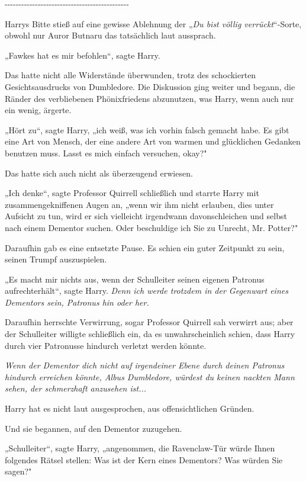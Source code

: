 {-\/-\/-\/-\/-\/-\/-\/-\/-\/-\/-\/-\/-\/-\/-\/-\/-\/-\/-\/-\/-\/-\/-\/-\/-\/-\/-\/-\/-\/-\/-\/-\/-\/-\/-\/-\/-\/-\/-\/-\/-\/-\/-\/-\/-

Harrys Bitte stieß auf eine gewisse Ablehnung der „\emph{Du bist völlig verrückt}“-Sorte, obwohl nur Auror Butnaru das tatsächlich laut aussprach.

„Fawkes hat es mir befohlen“, sagte Harry.

Das hatte nicht alle Widerstände überwunden, trotz des schockierten Gesichtsausdrucks von Dumbledore. Die Diskussion ging weiter und begann, die Ränder des verbliebenen Phönixfriedens abzunutzen, was Harry, wenn auch nur ein wenig, ärgerte.

„Hört zu“, sagte Harry, „ich weiß, was ich vorhin falsch gemacht habe. Es gibt eine Art von Mensch, der eine andere Art von warmen und glücklichen Gedanken benutzen muss. Lasst es mich einfach versuchen, okay?"

Das hatte sich auch nicht als überzeugend erwiesen.

„Ich denke“, sagte Professor Quirrell schließlich und starrte Harry mit zusammengekniffenen Augen an, „wenn wir ihm nicht erlauben, dies unter Aufsicht zu tun, wird er sich vielleicht irgendwann davonschleichen und selbst nach einem Dementor suchen. Oder beschuldige ich Sie zu Unrecht, Mr. Potter?"

Daraufhin gab es eine entsetzte Pause. Es schien ein guter Zeitpunkt zu sein, seinen Trumpf auszuspielen.

„Es macht mir nichts aus, wenn der Schulleiter seinen eigenen Patronus aufrechterhält“, sagte Harry. \emph{Denn ich werde trotzdem in der Gegenwart eines Dementors sein, Patronus hin oder her.}

Daraufhin herrschte Verwirrung, sogar Professor Quirrell sah verwirrt aus; aber der Schulleiter willigte schließlich ein, da es unwahrscheinlich schien, dass Harry durch vier Patronusse hindurch verletzt werden könnte.

\emph{Wenn der Dementor dich nicht auf irgendeiner Ebene durch deinen Patronus hindurch erreichen könnte, Albus Dumbledore, würdest du keinen nackten Mann sehen, der schmerzhaft anzusehen ist...}

Harry hat es nicht laut ausgesprochen, aus offensichtlichen Gründen.

Und sie begannen, auf den Dementor zuzugehen.

„Schulleiter“, sagte Harry, „angenommen, die Ravenclaw-Tür würde Ihnen folgendes Rätsel stellen: Was ist der Kern eines Dementors? Was würden Sie sagen?"

}
